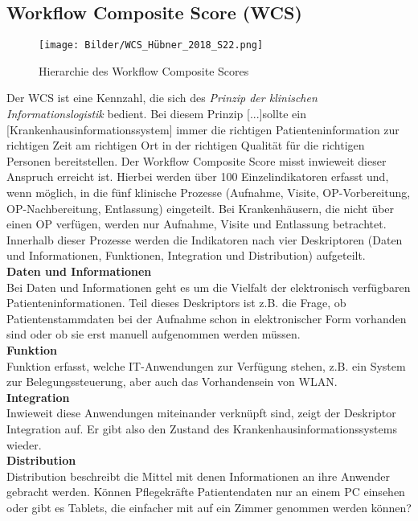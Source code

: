\subsection{Workflow Composite Score (WCS)}
	\begin{figure}[ht]
		\centering
		\texttt{[image: Bilder/WCS\_Hübner\_2018\_S22.png]}
		\caption{Hierarchie des Workflow Composite Scores \parencite[22]{huebner2018}}
		\label{fig:WCS}
	\end{figure}
	Der WCS ist eine Kennzahl, die sich des \textit{Prinzip der klinischen Informationslogistik} bedient. Bei diesem Prinzip \glqq{}[...]sollte ein [Krankenhausinformationssystem] immer die richtigen Patienteninformation zur richtigen Zeit am richtigen Ort in der richtigen Qualität für die richtigen Personen bereitstellen.\grqq\parencite[36]{huebner2019} Der Workflow Composite Score misst inwieweit dieser Anspruch erreicht ist. Hierbei werden über 100 Einzelindikatoren erfasst und, wenn möglich, in die fünf klinische Prozesse (Aufnahme, Visite, OP-Vorbereitung, OP-Nachbereitung, Entlassung) eingeteilt. Bei Krankenhäusern, die nicht über einen OP verfügen, werden nur Aufnahme, Visite und Entlassung betrachtet. Innerhalb dieser Prozesse werden die Indikatoren nach vier Deskriptoren (Daten und Informationen, Funktionen, Integration und Distribution) aufgeteilt. \parencite{huebner2019}
	\vspace{\parheadvspace}\\
	\textbf{Daten und Informationen}\\
	Bei Daten und Informationen geht es um die Vielfalt der elektronisch verfügbaren Patienteninformationen. Teil dieses Deskriptors ist z.B. die Frage, ob Patientenstammdaten bei der Aufnahme schon in elektronischer Form vorhanden sind oder ob sie erst manuell aufgenommen werden müssen. 
	\vspace{\parheadvspace}\\
	\textbf{Funktion}\\
	Funktion erfasst, welche IT-Anwendungen zur Verfügung stehen, z.B. ein System zur Belegungssteuerung, aber auch das Vorhandensein von WLAN.
	\vspace{\parheadvspace}\\
	\textbf{Integration}\\
	Inwieweit diese Anwendungen miteinander verknüpft sind, zeigt der Deskriptor Integration auf. Er gibt also den Zustand des Krankenhausinformationssystems wieder.
	\vspace{\parheadvspace}\\
	\textbf{Distribution}\\
	Distribution beschreibt die Mittel mit denen Informationen an ihre Anwender gebracht werden. Können Pflegekräfte Patientendaten nur an einem PC einsehen oder gibt es Tablets, die einfacher mit auf ein Zimmer genommen werden können?\\

